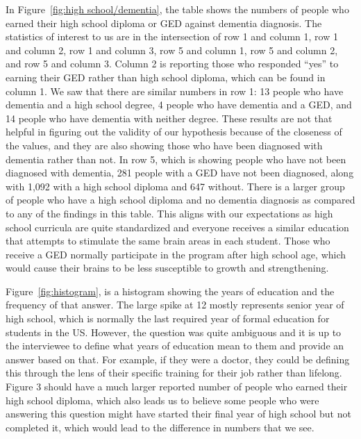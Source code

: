 \documentclass{article}
\begin{document}
\hspace*{1em} In Figure~\ref{fig:high school/dementia}, the table shows the numbers of people who earned their high school diploma or GED against dementia diagnosis. The statistics of interest to us are in the intersection of row 1 and column 1, row 1 and column 2, row 1 and column 3, row 5 and column 1, row 5 and column 2, and row 5 and column 3. Column 2 is reporting those who responded “yes” to earning their GED rather than high school diploma, which can be found in column 1. We saw that there are similar numbers in row 1: 13 people who have dementia and a high school degree, 4 people who have dementia and a GED, and 14 people who have dementia with neither degree. These results are not that helpful in figuring out the validity of our hypothesis because of the closeness of the values, and they are also showing those who have been diagnosed with dementia rather than not. In row 5, which is showing people who have not been diagnosed with dementia, 281 people with a GED have not been diagnosed, along with 1,092 with a high school diploma and 647 without. There is a larger group of people who have a high school diploma and no dementia diagnosis as compared to any of the findings in this table. This aligns with our expectations as high school curricula are quite standardized and everyone receives a similar education that attempts to stimulate the same brain areas in each student. Those who receive a GED normally participate in the program after high school age, which would cause their brains to be less susceptible to growth and strengthening.  

\hspace*{1em} Figure~\ref{fig:histogram}, is a histogram showing the years of education and the frequency of that answer. The large spike at 12 mostly represents senior year of high school, which is normally the last required year of formal education for students in the US. However, the question was quite ambiguous and it is up to the interviewee to define what years of education mean to them and provide an answer based on that. For example, if they were a doctor, they could be defining this through the lens of their specific training for their job rather than lifelong. Figure 3 should have a much larger reported number of people who earned their high school diploma, which also leads us to believe some people who were answering this question might have started their final year of high school but not completed it, which would lead to the difference in numbers that we see. 
\end{document}
